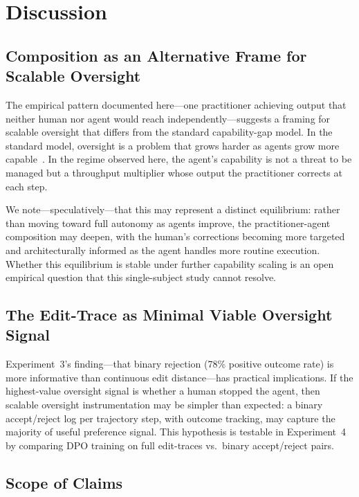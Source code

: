\documentclass[11pt]{article}
\begin{document}
\section{Discussion}
\label{sec:discussion}

\subsection{Composition as an Alternative Frame for Scalable Oversight}

The empirical pattern documented here---one practitioner achieving output that neither human nor agent would reach independently---suggests a framing for scalable oversight that differs from the standard capability-gap model.
In the standard model, oversight is a problem that grows harder as agents grow more capable~\citep{bowman2022measuring, burns2023weak}.
In the regime observed here, the agent's capability is not a threat to be managed but a throughput multiplier whose output the practitioner corrects at each step.

We note---speculatively---that this may represent a distinct equilibrium: rather than moving toward full autonomy as agents improve, the practitioner-agent composition may deepen, with the human's corrections becoming more targeted and architecturally informed as the agent handles more routine execution.
Whether this equilibrium is stable under further capability scaling is an open empirical question that this single-subject study cannot resolve.

\subsection{The Edit-Trace as Minimal Viable Oversight Signal}

Experiment~3's finding---that binary rejection (78\% positive outcome rate) is more informative than continuous edit distance---has practical implications.
If the highest-value oversight signal is whether a human stopped the agent, then scalable oversight instrumentation may be simpler than expected: a binary accept/reject log per trajectory step, with outcome tracking, may capture the majority of useful preference signal.
This hypothesis is testable in Experiment~4 by comparing DPO training on full edit-traces vs.\ binary accept/reject pairs.

\subsection{Scope of Claims}
\end{document}
